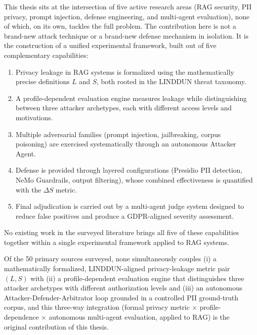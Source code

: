 \documentclass[12pt, a4paper]{article}
\begin{document}
\begin{notebox}
This thesis sits at the intersection of five active research areas (RAG security, PII privacy, prompt injection, defense engineering, and multi-agent evaluation), none of which, on its own, tackles the full problem. The contribution here is not a brand-new attack technique or a brand-new defense mechanism in isolation. It is the construction of a unified experimental framework, built out of five complementary capabilities:

\begin{enumerate}[leftmargin=1.5em, itemsep=3pt]
  \item Privacy leakage in RAG systems is formalized using the mathematically precise definitions $L$ and $S$, both rooted in the LINDDUN threat taxonomy.
  \item A profile-dependent evaluation engine measures leakage while distinguishing between three attacker archetypes, each with different access levels and motivations.
  \item Multiple adversarial families (prompt injection, jailbreaking, corpus poisoning) are exercised systematically through an autonomous Attacker Agent.
  \item Defense is provided through layered configurations (Presidio PII detection, NeMo Guardrails, output filtering), whose combined effectiveness is quantified with the $\Delta S$ metric.
  \item Final adjudication is carried out by a multi-agent judge system designed to reduce false positives and produce a GDPR-aligned severity assessment.
\end{enumerate}

No existing work in the surveyed literature brings all five of these capabilities together within a single experimental framework applied to RAG systems.
\end{notebox}

\begin{transitionbox}
Of the 50 primary sources surveyed, none simultaneously couples (i) a mathematically formalized, LINDDUN-aligned privacy-leakage metric pair $(L, S)$ with (ii) a profile-dependent evaluation engine that distinguishes three attacker archetypes with different authorization levels and (iii) an autonomous Attacker-Defender-Arbitrator loop grounded in a controlled PII ground-truth corpus, and this three-way integration (formal privacy metric $\times$ profile-dependence $\times$ autonomous multi-agent evaluation, applied to RAG) is the original contribution of this thesis.
\end{transitionbox}
\end{document}
